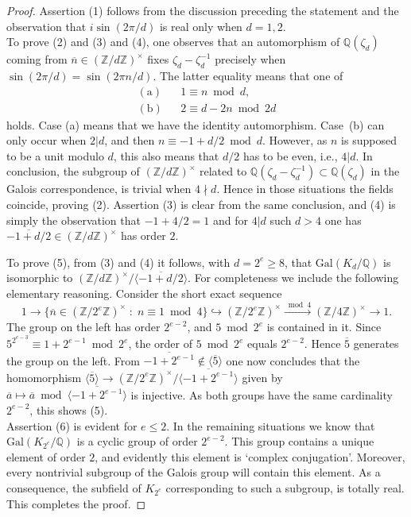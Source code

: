 \documentclass[10pt,a4paper]{amsart}
\newcommand{\QQ}{{\mathbb Q}}
\newcommand{\ZZ}{{\mathbb Z}}
\begin{document}
\begin{proof}
  Assertion (1) follows from the discussion preceding the
  statement and the observation that $i\sin(2\pi/d)$ is real
  only when $d=1,2$.\\
  To prove (2) and (3) and (4), one observes that an automorphism of $\QQ(\zeta_d)$
  coming from $\overline{n}\in (\ZZ/d\ZZ)^\times$ fixes $\zeta_d-\zeta_d^{-1}$
  precisely when $\sin(2\pi/d)=\sin(2\pi n/d)$. The latter equality means
  that one of 
  \[\begin{array}{ccl} (\textrm{a}) &&1\equiv n\bmod d,\\ (\textrm{b})&&2\equiv d-2n\bmod 2d\end{array} \]
  holds. Case (a) means that we have the identity automorphism.
  Case~(b) can only occur when $2|d$, and then $n\equiv -1+d/2\bmod d$. However,
  as $n$ is supposed to be a unit modulo $d$, this also means that $d/2$ has
  to be even, i.e., $4|d$. In conclusion, the subgroup of $(\ZZ/d\ZZ)^\times$
  related to $\QQ(\zeta_d-\zeta_d^{-1})\subset\QQ(\zeta_d)$ in the 
  Galois correspondence, is trivial when $4\nmid d$. Hence in those
  situations the fields coincide, proving (2). Assertion (3) is clear from
  the same conclusion, and (4) is simply the observation that
  $-1+4/2=1$ and for $4|d$ such $d>4$ one has $\overline{-1+d/2}\in (\ZZ/d\ZZ)^\times$ has order $2$.

  To prove (5), from (3) and (4) it follows, with $d=2^e\geq 8$, that $\textrm{Gal}(K_d/\QQ)$ is isomorphic to $(\ZZ/d\ZZ)^\times/\langle \overline{-1+d/2}\rangle$.
  For completeness we include the following elementary reasoning. Consider
  the short exact sequence
  \[ 1\to \{\overline{n}\in (\ZZ/2^e\ZZ)^\times\;:\;n\equiv 1\bmod 4\}\hookrightarrow (\ZZ/2^e\ZZ)^\times\stackrel{\bmod 4}{\longrightarrow}
  (\ZZ/4\ZZ)^\times\to 1.\]
  The group on the left has order $2^{e-2}$, and $5\bmod 2^e$ is contained in it.
  Since $5^{2^{e-3}}\equiv 1+2^{e-1}\bmod 2^e$, the order of $5\bmod 2^e$
  equals $2^{e-2}$. Hence $\overline{5}$ generates the group on the left.
  From $\overline{-1+2^{e-1}}\not\in\langle \overline{5}\rangle$ one now
  concludes that the homomorphism $\langle \overline{5}\rangle \to
  (\ZZ/2^e\ZZ)^\times/\langle \overline{-1+2^{e-1}}\rangle$ given by
  $\overline{a}\mapsto \overline{a}\bmod \langle \overline{-1+2^{e-1}}\rangle$
  is injective. As both groups have the same cardinality $2^{e-2}$, this 
  shows (5).\\
  Assertion (6) is evident for $e\leq 2$. In the remaining situations we know
  that $\textrm{Gal}(K_{2^e}/\QQ)$ is a cyclic group of order $2^{e-2}$.
  This group contains a unique element of order $2$, and evidently this
  element is `complex conjugation'. Moreover, every nontrivial
  subgroup of the Galois group will contain this element. As a consequence,
  the subfield of $K_{2^e}$ corresponding to such a subgroup, is totally real.
  This completes the proof.
\end{proof}
\end{document}
